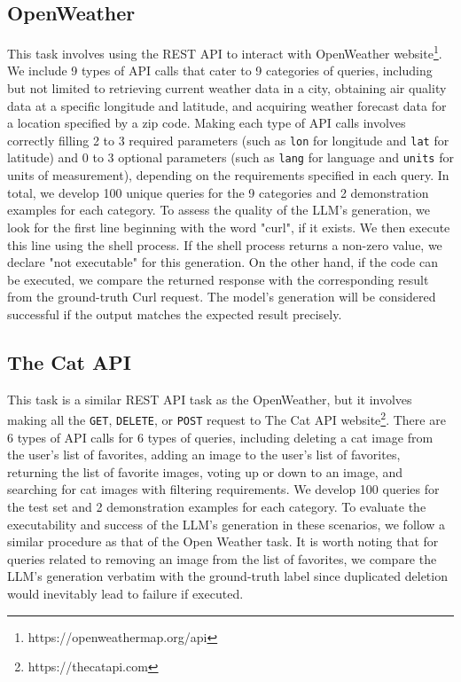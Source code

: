 
\subsection{OpenWeather}

This task involves using the REST API to interact with OpenWeather website\footnote{https://openweathermap.org/api}. We include 9 types of API calls that cater to 9 categories of queries, including but not limited to retrieving current weather data in a city, obtaining air quality data at a specific longitude and latitude, and acquiring weather forecast data for a location specified by a zip code. Making each type of API calls involves correctly filling 2 to 3 required parameters (such as \texttt{lon} for longitude and \texttt{lat} for latitude) and 0 to 3 optional parameters (such as \texttt{lang} for language and \texttt{units} for units of measurement), depending on the requirements specified in each query. In total, we develop 100 unique queries for the 9 categories and 2 demonstration examples for each category. To assess the quality of the LLM's generation, we look for the first line beginning with the word "curl", if it exists. We then execute this line using the shell process. If the shell process returns a non-zero value, we declare "not executable" for this generation. On the other hand, if the code can be executed, we compare the returned response with the corresponding result from the ground-truth Curl request. The model's generation will be considered successful if the output matches the expected result precisely.


\subsection{The Cat API}

This task is a similar REST API task as the OpenWeather, but it involves making all the \texttt{GET}, \texttt{DELETE}, or \texttt{POST} request to The Cat API website\footnote{https://thecatapi.com}. There are 6 types of API calls for 6 types of queries, including deleting a cat image from the user's list of favorites, adding an image to the user's list of favorites, returning the list of favorite images, voting up or down to an image, and searching for cat images with filtering requirements. We develop 100 queries for the test set and 2 demonstration examples for each category. To evaluate the executability and success of the LLM's generation in these scenarios, we follow a similar procedure as that of the Open Weather task. It is worth noting that for queries related to removing an image from the list of favorites, we compare the LLM's generation verbatim with the ground-truth label since duplicated deletion would inevitably lead to failure if executed.

